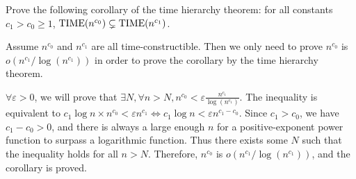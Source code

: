 \documentclass{homework}
\begin{document}
\begin{problem}
  Prove the following corollary of the time hierarchy theorem: for all constants
  $c_1 > c_0 \ge 1$, $\textup{TIME}(n^{c_0}) \subsetneq \textup{TIME}(n^{c_1})$.
\end{problem}

\begin{solution}
  Assume $n^{c_0}$ and $n^{c_1}$ are all time-constructible. Then we only need to prove $n^{c_0}$ is $o(n^{c_1}/\log(n^{c_1}))$ in order to prove the corollary by the time hierarchy theorem. 

  $\forall \varepsilon>0$, we will prove that $\exists N,\forall n>N,n^{c_0}<\varepsilon \frac{n^{c_1}}{\log(n^{c_1})}$. The inequality is equivalent to $c_1\log{n}\times n^{c_0}<\varepsilon n^{c_1} \iff c_1 \log n<\varepsilon n^{c_1-c_0}$. Since $c_1>c_0$, we have $c_1-c_0>0$, and there is always a large enough $n$ for a positive-exponent power function to surpass a logarithmic function. Thus there exists some $N$ such that the inequality holds for all $n>N$. Therefore, $n^{c_0}$ is $o(n^{c_1}/\log(n^{c_1}))$, and the corollary is proved.
\end{solution}

\begin{problem}
\end{problem}
\end{document}
